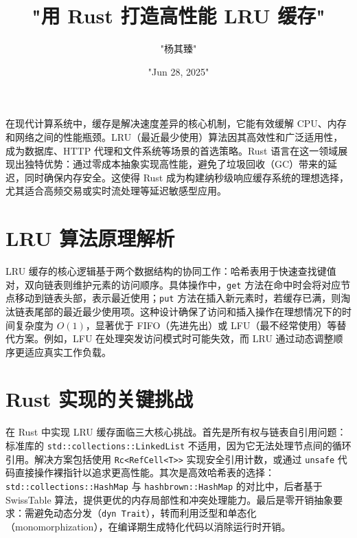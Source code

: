 \title{"用 Rust 打造高性能 LRU 缓存"}
\author{"杨其臻"}
\date{"Jun 28, 2025"}
\maketitle
在现代计算系统中，缓存是解决速度差异的核心机制，它能有效缓解 CPU、内存和网络之间的性能瓶颈。LRU（最近最少使用）算法因其高效性和广泛适用性，成为数据库、HTTP 代理和文件系统等场景的首选策略。Rust 语言在这一领域展现出独特优势：通过零成本抽象实现高性能，避免了垃圾回收（GC）带来的延迟，同时确保内存安全。这使得 Rust 成为构建纳秒级响应缓存系统的理想选择，尤其适合高频交易或实时流处理等延迟敏感型应用。\par
\chapter{LRU 算法原理解析}
LRU 缓存的核心逻辑基于两个数据结构的协同工作：哈希表用于快速查找键值对，双向链表则维护元素的访问顺序。具体操作中，\texttt{get} 方法在命中时会将对应节点移动到链表头部，表示最近使用；\texttt{put} 方法在插入新元素时，若缓存已满，则淘汰链表尾部的最近最少使用项。这种设计确保了访问和插入操作在理想情况下的时间复杂度为 $O(1)$，显著优于 FIFO（先进先出）或 LFU（最不经常使用）等替代方案。例如，LFU 在处理突发访问模式时可能失效，而 LRU 通过动态调整顺序更适应真实工作负载。\par
\chapter{Rust 实现的关键挑战}
在 Rust 中实现 LRU 缓存面临三大核心挑战。首先是所有权与链表自引用问题：标准库的 \texttt{std::collections::LinkedList} 不适用，因为它无法处理节点间的循环引用。解决方案包括使用 \texttt{Rc<RefCell<T>>} 实现安全引用计数，或通过 \texttt{unsafe} 代码直接操作裸指针以追求更高性能。其次是高效哈希表的选择：\texttt{std::collections::HashMap} 与 \texttt{hashbrown::HashMap} 的对比中，后者基于 SwissTable 算法，提供更优的内存局部性和冲突处理能力。最后是零开销抽象要求：需避免动态分发（\texttt{dyn Trait}），转而利用泛型和单态化（monomorphization），在编译期生成特化代码以消除运行时开销。\par
